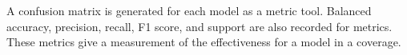 
\par
A confusion matrix is generated for each model as a metric tool.
Balanced accuracy, precision, recall, F1 score, and support are also recorded for metrics.
These metrics give a measurement of the effectiveness for a model in a coverage.

